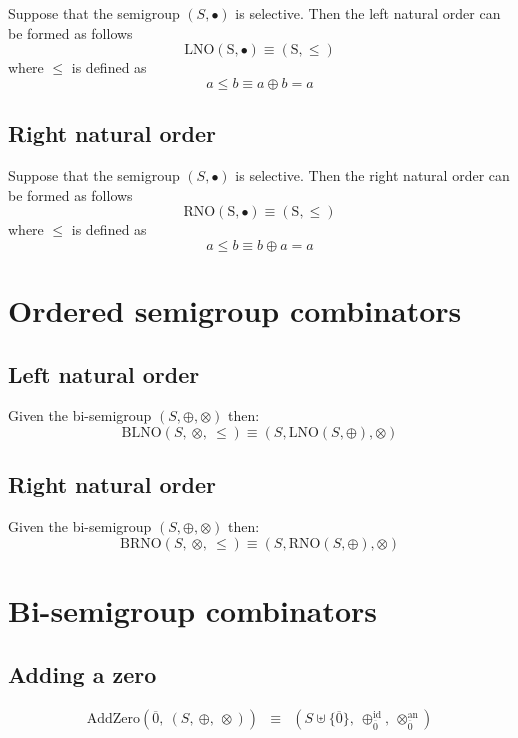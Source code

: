 \documentclass[10pt]{report}
\begin{document}
Suppose that the semigroup $(S , \bullet)$ is selective. Then the left natural order can be formed as follows
\begin{equation*}
\mathrm{LNO(S, \bullet)} \equiv \mathrm{(S , \leq)}
\end{equation*}
where $\leq$ is defined as
\begin{equation*}
a \leq b \equiv a \oplus b = a
\end{equation*}

\subsection{Right natural order}

Suppose that the semigroup $(S , \bullet)$ is selective. Then the right natural order can be formed as follows
\begin{equation*}
\mathrm{RNO(S, \bullet)} \equiv \mathrm{(S , \leq)}
\end{equation*}
where $\leq$ is defined as
\begin{equation*}
a \leq b \equiv b \oplus a = a
\end{equation*}


\section{Ordered semigroup combinators}

\subsection{Left natural order}

Given the bi-semigroup $(S , \oplus, \otimes)$ then:
\[
\mathrm{BLNO}(S,\ \otimes,\ \leq) \equiv (S, \mathrm{LNO}(S, \oplus), \otimes)
\]

\subsection{Right natural order}

Given the bi-semigroup $(S , \oplus, \otimes)$ then:
\[
\mathrm{BRNO}(S,\ \otimes,\ \leq) \equiv (S, \mathrm{RNO}(S, \oplus), \otimes)
\]



\section{Bi-semigroup combinators} 

\subsection{Adding a zero} 
\[ 
\begin{array}{rcl} 
\mathrm{AddZero}(\overline{0},\ (S,\ \oplus,\ \otimes)) 
   & \equiv 
   & (S \uplus \{\overline{0}\},\ \oplus_{\overline{0}}^{\mathrm{id}},\ \otimes_{\overline{0}}^{\mathrm{an}}) \\
\end{array} 
\] 
\end{document}
